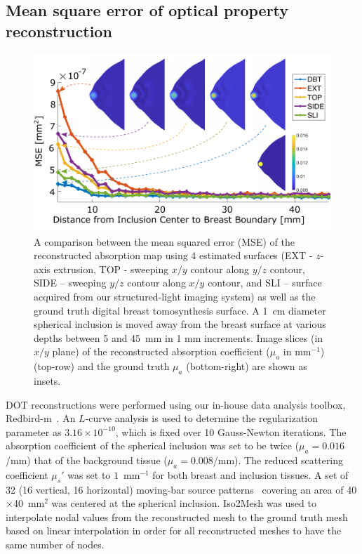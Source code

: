 \subsection{Mean square error of optical property reconstruction}
\begin{figure}
	\begin{center}
	    \includegraphics[width=.9\textwidth]{fig/omci/mse.pdf}
	\end{center}
	\caption{A comparison between the mean squared error (MSE) of the reconstructed absorption map using 4 estimated surfaces (EXT - $z$-axis extrusion, TOP - sweeping $x/y$ contour along $y/z$ contour, SIDE -- sweeping $y/z$ contour along $x/y$ contour, and SLI -- surface acquired from our structured-light imaging system) as well as the ground truth digital breast tomosynthesis surface. A 1~cm diameter spherical inclusion is moved away from the breast surface at various depths between 5 and 45~mm in 1 mm increments. Image slices (in $x/y$ plane) of the reconstructed absorption coefficient ($\mu_a$ in mm$^{-1}$) (top-row) and the ground truth $\mu_a$ (bottom-right) are shown as insets.}
	\label{fig:mse}
\end{figure} 

\ac{DOT} reconstructions were performed using our in-house data analysis toolbox, Redbird-m~\cite{Redbird2008}. An $L$-curve analysis is used to determine the regularization parameter as $3.16\times 10^{-10}$, which is fixed over 10 Gauss-Newton iterations. The absorption coefficient of the spherical inclusion was set to be twice ($\mu_a=0.016$/mm) that of the background tissue ($\mu_a=0.008$/mm). The reduced scattering coefficient $\mu_s'$ was set to $1$~mm$^{-1}$ for both breast and inclusion tissues. A set of 32 (16 vertical, 16 horizontal) moving-bar source patterns~\cite{Yao2015} covering an area of 40$\times$40~mm$^2$ was centered at the spherical inclusion. Iso2Mesh was used to interpolate nodal values from the reconstructed mesh to the ground truth mesh based on linear interpolation in order for all reconstructed meshes to have the same number of nodes.

